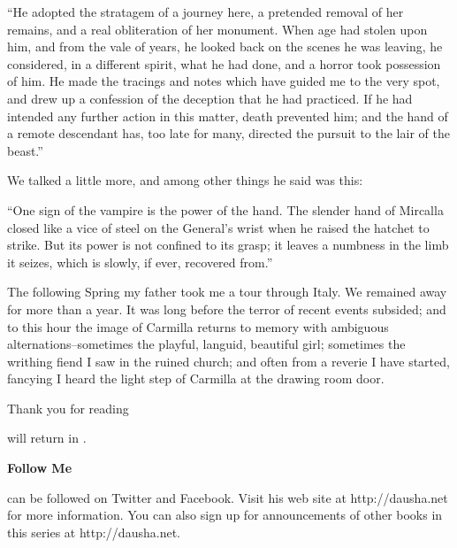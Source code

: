 \documentclass[11pt,twoside,makeidx,hidelinks,]{memoir}
\def\NextBook{}
\def\ReturningCharacters{}
\begin{document}
``He adopted the stratagem of a journey here, a pretended removal of her
remains, and a real obliteration of her monument. When age had stolen
upon him, and from the vale of years, he looked back on the scenes he
was leaving, he considered, in a different spirit, what he had done, and
a horror took possession of him. He made the tracings and notes which
have guided me to the very spot, and drew up a confession of the
deception that he had practiced. If he had intended any further action
in this matter, death prevented him; and the hand of a remote descendant
has, too late for many, directed the pursuit to the lair of the beast.''

We talked a little more, and among other things he said was this:

``One sign of the vampire is the power of the hand. The slender hand of
Mircalla closed like a vice of steel on the General's wrist when he
raised the hatchet to strike. But its power is not confined to its
grasp; it leaves a numbness in the limb it seizes, which is slowly, if
ever, recovered from.''

The following Spring my father took me a tour through Italy. We remained
away for more than a year. It was long before the terror of recent
events subsided; and to this hour the image of Carmilla returns to
memory with ambiguous alternations--sometimes the playful, languid,
beautiful girl; sometimes the writhing fiend I saw in the ruined church;
and often from a reverie I have started, fancying I heard the light step
of Carmilla at the drawing room door.

\pbreak{}



\backmatter

% 
\begin{center}
  \vspace*{\fill}

  {\Large \par
  \noindent Thank you for reading

  \vspace*{0.125in}
  {\LARGE\textbf{\textsf{\thetitle}}}
  \vspace*{0.125in}

  \ifdefined\ReturningCharacters
    \par
    \noindent\ReturningCharacters{} will return in \emph{\NextBook}.} \vspace*{\fill}
  \fi

  {\LARGE\textbf{\textsf{Follow Me}}}

  \vspace*{0.125in}

  \textbf{\theauthor{}} can be followed on Twitter and Facebook.
  \newline Visit his web site at http://dausha.net for more information. You can also sign up for announcements of other books in this series at http://dausha.net.

  \vspace*{\fill}
\end{center}
\end{document}
